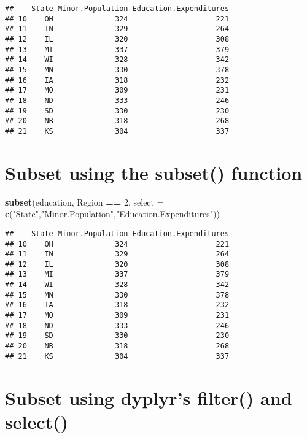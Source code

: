 \documentclass[]{book}
\newenvironment{Shaded}{\begin{snugshade}}{\end{snugshade}}
\newcommand{\DataTypeTok}[1]{\textcolor[rgb]{0.13,0.29,0.53}{#1}}
\newcommand{\DecValTok}[1]{\textcolor[rgb]{0.00,0.00,0.81}{#1}}
\newcommand{\KeywordTok}[1]{\textcolor[rgb]{0.13,0.29,0.53}{\textbf{#1}}}
\newcommand{\NormalTok}[1]{#1}
\newcommand{\OperatorTok}[1]{\textcolor[rgb]{0.81,0.36,0.00}{\textbf{#1}}}
\newcommand{\StringTok}[1]{\textcolor[rgb]{0.31,0.60,0.02}{#1}}
\begin{document}
\begin{verbatim}
##    State Minor.Population Education.Expenditures
## 10    OH              324                    221
## 11    IN              329                    264
## 12    IL              320                    308
## 13    MI              337                    379
## 14    WI              328                    342
## 15    MN              330                    378
## 16    IA              318                    232
## 17    MO              309                    231
## 18    ND              333                    246
## 19    SD              330                    230
## 20    NB              318                    268
## 21    KS              304                    337
\end{verbatim}

\hypertarget{subset-using-the-subset-function}{%
\section{Subset using the subset() function}\label{subset-using-the-subset-function}}

\begin{Shaded}
\begin{Highlighting}[]
\KeywordTok{subset}\NormalTok{(education, Region }\OperatorTok{==}\StringTok{ }\DecValTok{2}\NormalTok{, }\DataTypeTok{select =} \KeywordTok{c}\NormalTok{(}\StringTok{"State"}\NormalTok{,}\StringTok{"Minor.Population"}\NormalTok{,}\StringTok{"Education.Expenditures"}\NormalTok{))}
\end{Highlighting}
\end{Shaded}

\begin{verbatim}
##    State Minor.Population Education.Expenditures
## 10    OH              324                    221
## 11    IN              329                    264
## 12    IL              320                    308
## 13    MI              337                    379
## 14    WI              328                    342
## 15    MN              330                    378
## 16    IA              318                    232
## 17    MO              309                    231
## 18    ND              333                    246
## 19    SD              330                    230
## 20    NB              318                    268
## 21    KS              304                    337
\end{verbatim}

\hypertarget{subset-using-dyplyrs-filter-and-select}{%
\section{Subset using dyplyr's filter() and select()}\label{subset-using-dyplyrs-filter-and-select}}
\end{document}
